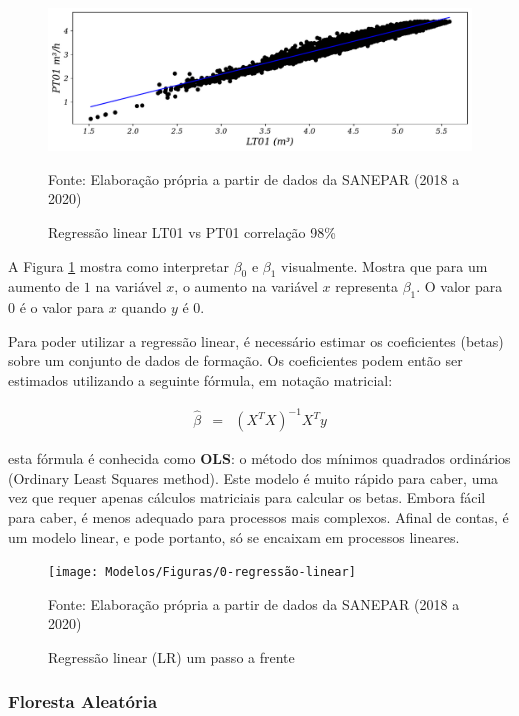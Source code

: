 \begin{figure}[H]
	\centering
	\caption{Regressão linear LT01 vs PT01 correlação 98\%}
	\label{fig:lr-lt01-m3}
	\includegraphics[width=0.9\linewidth]{"Modelos/Figuras/LR LT01 (m³)"}
	
	Fonte: Elaboração própria a partir de dados da SANEPAR (2018 a 2020)
\end{figure}



A Figura \ref{fig:lr-lt01-m3} mostra como interpretar $\beta_0$ e $\beta_1$ visualmente. Mostra que para um aumento de $1$ na variável $x$, o aumento na variável $x$ representa $\beta_1$. O valor para $0$ é o valor para $x$ quando $y$ é $0$.

Para poder utilizar a regressão linear, é necessário estimar os coeficientes (betas) sobre um conjunto de dados de formação. Os coeficientes podem então ser estimados utilizando a seguinte fórmula, em notação matricial:

\begin{eqnarray}
	\hat{\beta}&=&\left(X^T X\right)^{-1} X^T y\label{eq:ols}
\end{eqnarray}

 esta fórmula é conhecida como \textbf{OLS}: o método dos mínimos quadrados ordinários (Ordinary Least Squares method). Este modelo é muito rápido para caber, uma vez que requer apenas cálculos matriciais para calcular os betas. Embora fácil para caber, é menos adequado para processos mais complexos. Afinal de contas, é um modelo linear, e pode portanto, só se encaixam em processos lineares.

\begin{figure}[H]
	\centering
	\caption{Regressão linear (LR) um passo a frente}
	\label{fig:1-regressao-linear}
	\texttt{[image: Modelos/Figuras/0-regressão-linear]}
	
	Fonte: Elaboração própria a partir de dados da SANEPAR (2018 a 2020)
\end{figure}


\subsubsection{Floresta Aleat\'oria} \label{subsubsec:rf}

